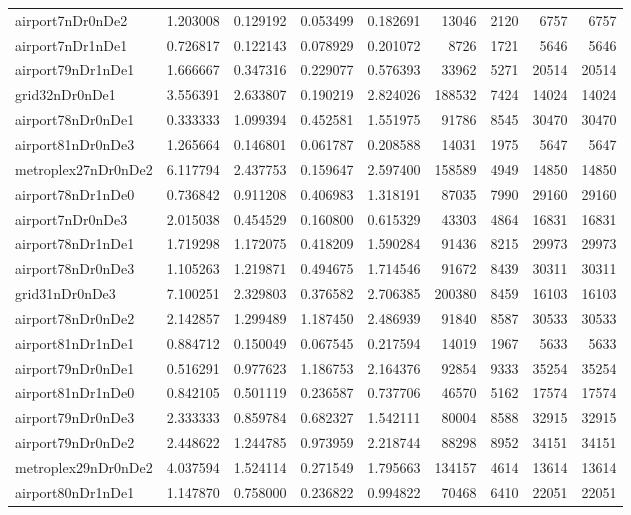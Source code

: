 \begin{longtable}{|l|r|r|r|r|r|r|r|r|}
airport7nDr0nDe2 & 1.203008 & 0.129192 & 0.053499 & 0.182691 & 13046 & 2120 & 6757 & 6757 \\
airport7nDr1nDe1 & 0.726817 & 0.122143 & 0.078929 & 0.201072 & 8726 & 1721 & 5646 & 5646 \\
airport79nDr1nDe1 & 1.666667 & 0.347316 & 0.229077 & 0.576393 & 33962 & 5271 & 20514 & 20514 \\
grid32nDr0nDe1 & 3.556391 & 2.633807 & 0.190219 & 2.824026 & 188532 & 7424 & 14024 & 14024 \\
airport78nDr0nDe1 & 0.333333 & 1.099394 & 0.452581 & 1.551975 & 91786 & 8545 & 30470 & 30470 \\
airport81nDr0nDe3 & 1.265664 & 0.146801 & 0.061787 & 0.208588 & 14031 & 1975 & 5647 & 5647 \\
metroplex27nDr0nDe2 & 6.117794 & 2.437753 & 0.159647 & 2.597400 & 158589 & 4949 & 14850 & 14850 \\
airport78nDr1nDe0 & 0.736842 & 0.911208 & 0.406983 & 1.318191 & 87035 & 7990 & 29160 & 29160 \\
airport7nDr0nDe3 & 2.015038 & 0.454529 & 0.160800 & 0.615329 & 43303 & 4864 & 16831 & 16831 \\
airport78nDr1nDe1 & 1.719298 & 1.172075 & 0.418209 & 1.590284 & 91436 & 8215 & 29973 & 29973 \\
airport78nDr0nDe3 & 1.105263 & 1.219871 & 0.494675 & 1.714546 & 91672 & 8439 & 30311 & 30311 \\
grid31nDr0nDe3 & 7.100251 & 2.329803 & 0.376582 & 2.706385 & 200380 & 8459 & 16103 & 16103 \\
airport78nDr0nDe2 & 2.142857 & 1.299489 & 1.187450 & 2.486939 & 91840 & 8587 & 30533 & 30533 \\
airport81nDr1nDe1 & 0.884712 & 0.150049 & 0.067545 & 0.217594 & 14019 & 1967 & 5633 & 5633 \\
airport79nDr0nDe1 & 0.516291 & 0.977623 & 1.186753 & 2.164376 & 92854 & 9333 & 35254 & 35254 \\
airport81nDr1nDe0 & 0.842105 & 0.501119 & 0.236587 & 0.737706 & 46570 & 5162 & 17574 & 17574 \\
airport79nDr0nDe3 & 2.333333 & 0.859784 & 0.682327 & 1.542111 & 80004 & 8588 & 32915 & 32915 \\
airport79nDr0nDe2 & 2.448622 & 1.244785 & 0.973959 & 2.218744 & 88298 & 8952 & 34151 & 34151 \\
metroplex29nDr0nDe2 & 4.037594 & 1.524114 & 0.271549 & 1.795663 & 134157 & 4614 & 13614 & 13614 \\
airport80nDr1nDe1 & 1.147870 & 0.758000 & 0.236822 & 0.994822 & 70468 & 6410 & 22051 & 22051 \\

\end{longtable}

